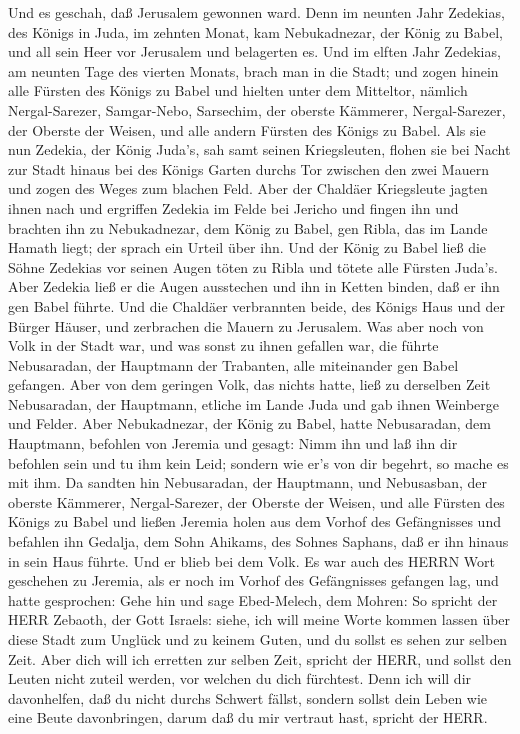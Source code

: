  Und es geschah, daß Jerusalem gewonnen ward. Denn im
neunten Jahr Zedekias, des Königs in Juda, im zehnten Monat, kam
Nebukadnezar, der König zu Babel, und all sein Heer vor Jerusalem und
belagerten es.  Und im elften Jahr Zedekias, am neunten Tage
des vierten Monats, brach man in die Stadt;  und zogen
hinein alle Fürsten des Königs zu Babel und hielten unter dem Mitteltor,
nämlich Nergal-Sarezer, Samgar-Nebo, Sarsechim, der oberste Kämmerer,
Nergal-Sarezer, der Oberste der Weisen, und alle andern Fürsten des
Königs zu Babel.  Als sie nun Zedekia, der König Juda's, sah
samt seinen Kriegsleuten, flohen sie bei Nacht zur Stadt hinaus bei des
Königs Garten durchs Tor zwischen den zwei Mauern und zogen des Weges
zum blachen Feld.  Aber der Chaldäer Kriegsleute jagten
ihnen nach und ergriffen Zedekia im Felde bei Jericho und fingen ihn und
brachten ihn zu Nebukadnezar, dem König zu Babel, gen Ribla, das im
Lande Hamath liegt; der sprach ein Urteil über ihn.  Und der
König zu Babel ließ die Söhne Zedekias vor seinen Augen töten zu Ribla
und tötete alle Fürsten Juda's.  Aber Zedekia ließ er die
Augen ausstechen und ihn in Ketten binden, daß er ihn gen Babel führte.
 Und die Chaldäer verbrannten beide, des Königs Haus und der
Bürger Häuser, und zerbrachen die Mauern zu Jerusalem.  Was
aber noch von Volk in der Stadt war, und was sonst zu ihnen gefallen
war, die führte Nebusaradan, der Hauptmann der Trabanten, alle
miteinander gen Babel gefangen.  Aber von dem geringen
Volk, das nichts hatte, ließ zu derselben Zeit Nebusaradan, der
Hauptmann, etliche im Lande Juda und gab ihnen Weinberge und Felder.
 Aber Nebukadnezar, der König zu Babel, hatte Nebusaradan,
dem Hauptmann, befohlen von Jeremia und gesagt:  Nimm ihn
und laß ihn dir befohlen sein und tu ihm kein Leid; sondern wie er's von
dir begehrt, so mache es mit ihm.  Da sandten hin
Nebusaradan, der Hauptmann, und Nebusasban, der oberste Kämmerer,
Nergal-Sarezer, der Oberste der Weisen, und alle Fürsten des Königs zu
Babel  und ließen Jeremia holen aus dem Vorhof des
Gefängnisses und befahlen ihn Gedalja, dem Sohn Ahikams, des Sohnes
Saphans, daß er ihn hinaus in sein Haus führte. Und er blieb bei dem
Volk.  Es war auch des HERRN Wort geschehen zu Jeremia, als
er noch im Vorhof des Gefängnisses gefangen lag, und hatte gesprochen:
 Gehe hin und sage Ebed-Melech, dem Mohren: So spricht der
HERR Zebaoth, der Gott Israels: siehe, ich will meine Worte kommen
lassen über diese Stadt zum Unglück und zu keinem Guten, und du sollst
es sehen zur selben Zeit.  Aber dich will ich erretten zur
selben Zeit, spricht der HERR, und sollst den Leuten nicht zuteil
werden, vor welchen du dich fürchtest.  Denn ich will dir
davonhelfen, daß du nicht durchs Schwert fällst, sondern sollst dein
Leben wie eine Beute davonbringen, darum daß du mir vertraut hast,
spricht der HERR.

